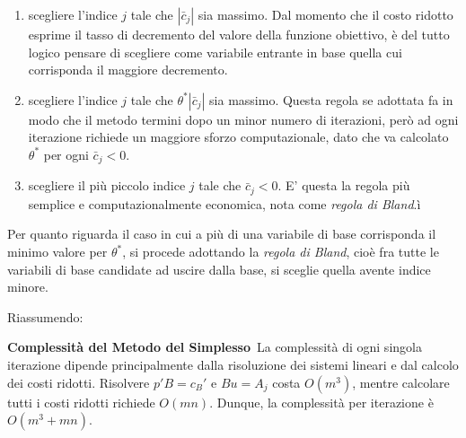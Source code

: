 \begin{enumerate}
    \item scegliere l'indice $j$ tale che $|\bar{c}_j|$ sia massimo.
    Dal momento che il costo ridotto esprime il tasso di decremento del valore della funzione obiettivo, è del tutto logico pensare di scegliere come variabile entrante in base quella cui corrisponda il maggiore decremento.

    \item scegliere l'indice $j$ tale che $\theta^* |\bar{c}_j|$ sia massimo.
    Questa regola se adottata fa in modo che il metodo termini dopo un minor numero di iterazioni, però ad ogni iterazione richiede un maggiore sforzo computazionale, dato che va calcolato $\theta^*$ per ogni $\bar{c}_j < 0$.

    \item scegliere il più piccolo indice $j$ tale che $\bar{c}_j < 0$.
    E' questa la regola più semplice e computazionalmente economica, nota come \textit{regola di Bland}.ì
\end{enumerate}

Per quanto riguarda il caso in cui a più di una variabile di base corrisponda il minimo valore per $\theta^*$, si procede adottando la \textit{regola di Bland}, cioè fra tutte le variabili di base candidate ad uscire dalla base, si sceglie quella avente indice minore.

Riassumendo: \\



\newpage

\textbf{Complessità del Metodo del Simplesso}\
La complessità di ogni singola iterazione dipende principalmente dalla risoluzione dei sistemi lineari e dal calcolo dei costi ridotti. Risolvere $p'B = c_B'$ e $Bu = A_j$ costa $O(m^3)$, mentre calcolare tutti i costi ridotti richiede $O(mn)$. Dunque, la complessità per iterazione è $O(m^3 + mn)$.

